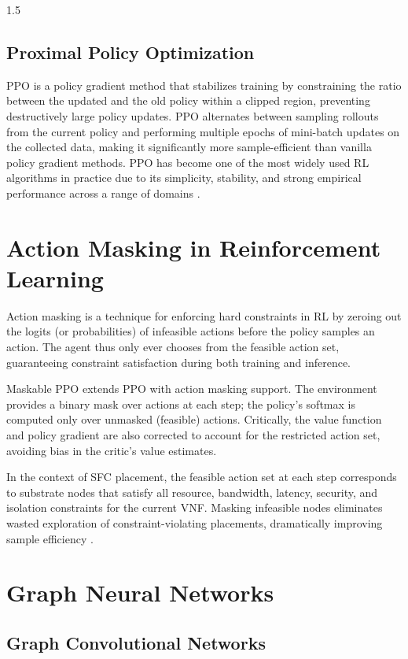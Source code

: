 \documentclass[A4paper,12pt]{report}
\theoremstyle{plain}
\theoremstyle{definition}
\theoremstyle{remark}
\numberwithin{equation}{section}
\begin{document}
\begin{spacing}{1.5}
\subsection{Proximal Policy Optimization}

PPO \cite{schulman2017} is a policy gradient method that stabilizes training by constraining the ratio between the updated and the old policy within a clipped region, preventing destructively large policy updates. PPO alternates between sampling rollouts from the current policy and performing multiple epochs of mini-batch updates on the collected data, making it significantly more sample-efficient than vanilla policy gradient methods. PPO has become one of the most widely used RL algorithms in practice due to its simplicity, stability, and strong empirical performance across a range of domains \cite{raffin2021}.

\section{Action Masking in Reinforcement Learning}

Action masking \cite{huang2020, vinyals2019} is a technique for enforcing hard constraints in RL by zeroing out the logits (or probabilities) of infeasible actions before the policy samples an action. The agent thus only ever chooses from the feasible action set, guaranteeing constraint satisfaction during both training and inference.

Maskable PPO \cite{sb3contrib2021} extends PPO with action masking support. The environment provides a binary mask over actions at each step; the policy's softmax is computed only over unmasked (feasible) actions. Critically, the value function and policy gradient are also corrected to account for the restricted action set, avoiding bias in the critic's value estimates.

In the context of SFC placement, the feasible action set at each step corresponds to substrate nodes that satisfy all resource, bandwidth, latency, security, and isolation constraints for the current VNF. Masking infeasible nodes eliminates wasted exploration of constraint-violating placements, dramatically improving sample efficiency \cite{huang2020}.

\section{Graph Neural Networks}

\subsection{Graph Convolutional Networks}


\end{spacing}
\end{document}
